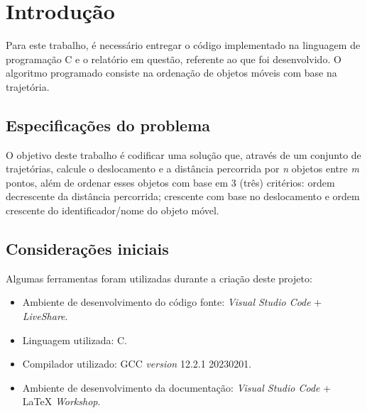 \documentclass{article}
\begin{document}



\section{Introdução}

\hspace*{\parindent}Para este trabalho, é necessário entregar o código implementado na linguagem de programação C e o relatório em questão, referente ao que foi desenvolvido. O algoritmo programado consiste na ordenação de objetos móveis com base na trajetória.


\subsection{Especificações do problema}

\hspace*{\parindent}O objetivo deste trabalho é codificar uma solução que, através de um conjunto de trajetórias, calcule o deslocamento e a distância percorrida por \textit{n} objetos entre \textit{m} pontos, além de ordenar esses objetos com base em 3 (três) critérios: ordem decrescente da distância percorrida; crescente com base no deslocamento e ordem crescente do identificador/nome do objeto móvel.


\subsection{Considerações iniciais}

\hspace*{\parindent}Algumas ferramentas foram utilizadas durante a criação deste projeto:

\begin{itemize}
  \item Ambiente de desenvolvimento do código fonte: \textit{Visual Studio Code} + \textit{LiveShare}.
  \item Linguagem utilizada: C.
  \item Compilador utilizado: GCC \textit{version} 12.2.1 20230201.
  \item Ambiente de desenvolvimento da documentação: \textit{Visual Studio Code} + \LaTeX $ $ \textit{Workshop}.
\end{itemize}
\end{document}
